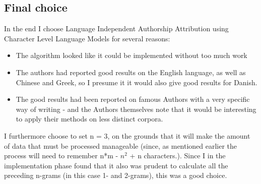 \subsection{Final choice}

In the end I choose Language Independent Authorship Attribution using Character Level Language Models for several reasons:
\begin{itemize}
\item The algorithm looked like it could be implemented without too much work
\item The authors had reported good results on the English language, as well as Chinese and Greek, so I presume it it would also give good results for Danish.
\item The good results had been reported on famous Authors with a very specific way of writing - and the Authors themselves note that it would be interesting to apply their methods on less distinct corpora. 
\end{itemize}

I furthermore choose to set n = 3, on the grounds that it will make the amount of data that must be processed manageable (since, as mentioned earlier the process will need to remember n*m - $n^2$ + n characters.). Since I in the implementation phase found that it also was prudent to calculate all the preceding n-grams (in this case 1- and 2-grams), this was a good choice.
